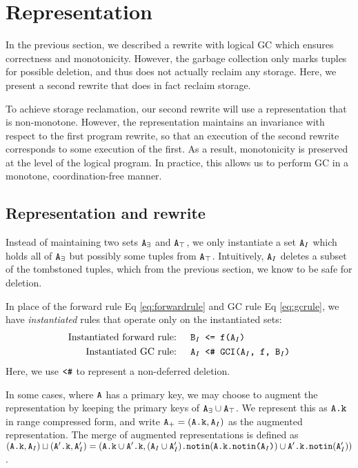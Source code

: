 \documentclass[10pt]{proc}
\numberwithin{equation}{section}
\renewcommand{\tt}[1]{\ifmmode\text{\texttt{#1}}\else\texttt{#1}\fi}
\begin{document}
\section{Representation}
In the previous section, we described a rewrite with logical GC which ensures correctness and monotonicity.
However, the garbage collection only marks tuples for possible deletion, and thus does not actually reclaim any storage.
Here, we present a second rewrite that does in fact reclaim storage.

To achieve storage reclamation, our second rewrite will use a representation that is non-monotone.
However, the representation maintains an invariance with respect to the first program rewrite, so that an execution of the second rewrite corresponds to some execution of the first.
As a result, monotonicity is preserved at the level of the logical program.
In practice, this allows us to perform GC in a monotone, coordination-free manner.

\subsection{Representation and rewrite}
Instead of maintaining two sets $\tt{A}_\exists$ and $\tt{A}_\top$, we only instantiate a set $\tt{A}_I$ which holds all of $\tt{A}_\exists$ but possibly some tuples from $\tt{A}_\top$.
Intuitively, $\tt{A}_I$ deletes a subset of the tombstoned tuples, which from the previous section, we know to be safe for deletion.

In place of the forward rule Eq \eqref{eq:forwardrule} and GC rule Eq \eqref{eq:gcrule}, we have \textit{instantiated} rules that operate only on the instantiated sets: 
\begin{align}
\text{Instantiated forward rule: } && \tt{B}_I &\tt{ <= f(A$_I$)}\label{eq:instantiatedforwardrule}\\
\text{Instantiated GC rule: } && \tt{A}_I &\tt{ <\# GCI(A$_I$, f, B$_I$)}\label{eq:instantiatedgcrule}
\end{align}
Here, we use $\tt{<\#}$ to represent a non-deferred deletion.

In some cases, where $\tt{A}$ has a primary key, we may choose to augment the representation by keeping the primary keys of $\tt{A}_\exists \cup \tt{A}_\top$.
We represent this as $\tt{A.k}$ in range compressed form, and write $\tt{A}_+ = (\tt{A.k}, \tt{A}_I)$ as the augmented representation.
The merge of augmented representations is defined as $(\tt{A.k}, \tt{A}_I) \sqcup (\tt{A}'\tt{.k}, \tt{A}_I') = (\tt{A.k} \cup \tt{A}'\tt{.k}, (\tt{A}_I \cup \tt{A}'_I)\tt{.notin}(\tt{A.k.notin(A$_I$)}) \cup \tt{A}'\tt{.k}\tt{.notin}(\tt{A}'_I))$.
\end{document}
